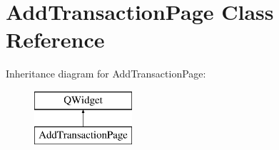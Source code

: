 \hypertarget{class_add_transaction_page}{}\section{Add\+Transaction\+Page Class Reference}
\label{class_add_transaction_page}
Inheritance diagram for Add\+Transaction\+Page\+:\begin{figure}[H]
\begin{center}
\leavevmode
\includegraphics[height=2.000000cm]{class_add_transaction_page}
\end{center}
\end{figure}
